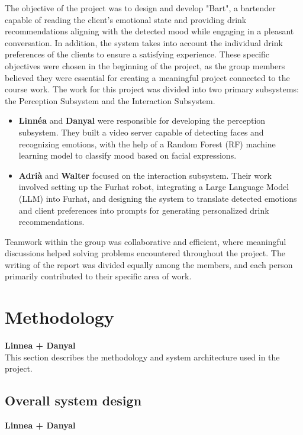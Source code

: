 \documentclass[conference]{IEEEtran}
\begin{document}
The objective of the project was to design and develop "Bart", a bartender capable of reading the client's emotional state and providing drink recommendations aligning with the detected mood while engaging in a pleasant conversation. In addition, the system takes into account the individual drink preferences of the clients to ensure a satisfying experience. These specific objectives were chosen in the beginning of the project, as the group members believed they were essential for creating a meaningful project connected to the course work. 
The work for this project was divided into two primary subsystems: the Perception Subsystem and the Interaction Subsystem. 

\begin{itemize}
    \item \textbf{Linnéa} and \textbf{Danyal} were responsible for developing the perception subsystem. They built a video server capable of detecting faces and recognizing emotions, with the help of a Random Forest (RF) machine learning model to classify mood based on facial expressions.
    
    
    \item \textbf{Adrià} and \textbf{Walter} focused on the interaction subsystem. Their work involved setting up the Furhat robot, integrating a Large Language Model (LLM) into Furhat, and designing the system to translate detected emotions and client preferences into prompts for generating personalized drink recommendations.

\end{itemize}

Teamwork within the group was collaborative and efficient, where meaningful discussions helped solving problems encountered throughout the project. The writing of the report was divided equally among the members, and each person primarily contributed to their specific area of work.
\\
\section{Methodology}
\textbf{Linnea + Danyal}
\\
This section describes the methodology and system architecture used in the project.

\subsection{Overall system design}
\textbf{Linnea + Danyal}
\end{document}
